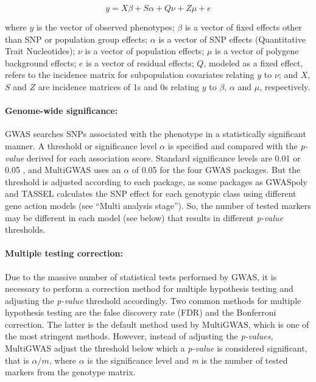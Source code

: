 \documentclass{article}
\begin{document}
\[
y=X\beta+S\alpha+Q\nu+Z\mu+e
\]

where $y$ is the vector of observed phenotypes; $\beta$ is a vector of fixed effects other than SNP or population group effects; $\alpha$ is a vector of SNP effects (Quantitative Trait Nucleotides); $\nu$ is a vector of population effects; $\mu$ is a vector of polygene background effects; $e$ is a vector of residual effects; $Q$, modeled as a fixed effect, refers to the incidence matrix for subpopulation covariates relating $y$ to $\nu$; and $X$, $S$ and $Z$ are incidence matrices of 1s and 0s relating $y$ to $\beta$, $\alpha$ and $\mu$, respectively.


\paragraph{Genome-wide significance: }

GWAS searches SNPs associated with the phenotype in a statistically significant manner. A threshold or significance level $\alpha$ is specified and compared with the \emph{p-value} derived for each association score. Standard significance levels are 0.01 or 0.05 \cite{Gumpinger2018,Rosyara2016}, and MultiGWAS uses an $\alpha$ of 0.05 for the four GWAS packages. But the threshold is adjusted according to each package, as some packages as GWASpoly and TASSEL calculates the SNP effect for each genotypic class using different gene action models (see ``Multi analysis stage''). So, the number of tested markers\emph{ }may be different in each model (see below) that results in different \emph{p-value} thresholds.

\paragraph{Multiple testing correction:}

Due to the massive number of statistical tests performed by GWAS, it is necessary to perform a correction method for multiple hypothesis testing and adjusting the \emph{p-value} threshold accordingly. Two common methods for multiple hypothesis testing are the false discovery rate (FDR) and the Bonferroni correction. The latter is the default method used by MultiGWAS, which is one of the most stringent methods. However, instead of adjusting the \emph{p-values,} MultiGWAS adjust the threshold below which a \emph{p-value} is considered significant, that is $\alpha/m$, where $\alpha$ is the significance level and \emph{m }is the number of tested markers from the genotype matrix. 
\end{document}
